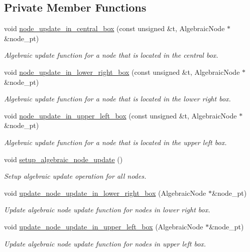 \subsection*{Private Member Functions}
\begin{DoxyCompactItemize}
\item 
void \hyperlink{classoomph_1_1AlgebraicRefineableQuarterCircleSectorMesh_a89dc4a592e3f188f9bfbffd5c7fdbbcc}{node\+\_\+update\+\_\+in\+\_\+central\+\_\+box} (const unsigned \&t, Algebraic\+Node $\ast$\&node\+\_\+pt)
\begin{DoxyCompactList}\small\item\em Algebraic update function for a node that is located in the central box. \end{DoxyCompactList}\item 
void \hyperlink{classoomph_1_1AlgebraicRefineableQuarterCircleSectorMesh_a9a7d3e4a2126346cdae3bde51eff7b36}{node\+\_\+update\+\_\+in\+\_\+lower\+\_\+right\+\_\+box} (const unsigned \&t, Algebraic\+Node $\ast$\&node\+\_\+pt)
\begin{DoxyCompactList}\small\item\em Algebraic update function for a node that is located in the lower right box. \end{DoxyCompactList}\item 
void \hyperlink{classoomph_1_1AlgebraicRefineableQuarterCircleSectorMesh_aeb36f6747d14cd68d4857169fa0f22d1}{node\+\_\+update\+\_\+in\+\_\+upper\+\_\+left\+\_\+box} (const unsigned \&t, Algebraic\+Node $\ast$\&node\+\_\+pt)
\begin{DoxyCompactList}\small\item\em Algebraic update function for a node that is located in the upper left box. \end{DoxyCompactList}\item 
void \hyperlink{classoomph_1_1AlgebraicRefineableQuarterCircleSectorMesh_a3eb269dc5c26355a808d1c5035190017}{setup\+\_\+algebraic\+\_\+node\+\_\+update} ()
\begin{DoxyCompactList}\small\item\em Setup algebraic update operation for all nodes. \end{DoxyCompactList}\item 
void \hyperlink{classoomph_1_1AlgebraicRefineableQuarterCircleSectorMesh_a77154a45d65fa66d220bad2a3e860c8e}{update\+\_\+node\+\_\+update\+\_\+in\+\_\+lower\+\_\+right\+\_\+box} (Algebraic\+Node $\ast$\&node\+\_\+pt)
\begin{DoxyCompactList}\small\item\em Update algebraic node update function for nodes in lower right box. \end{DoxyCompactList}\item 
void \hyperlink{classoomph_1_1AlgebraicRefineableQuarterCircleSectorMesh_ab1e4847ffef953e66aafff14f35b7141}{update\+\_\+node\+\_\+update\+\_\+in\+\_\+upper\+\_\+left\+\_\+box} (Algebraic\+Node $\ast$\&node\+\_\+pt)
\begin{DoxyCompactList}\small\item\em Update algebraic node update function for nodes in upper left box. \end{DoxyCompactList}\end{DoxyCompactItemize}
